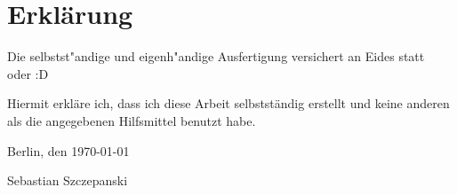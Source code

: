 \newpage
\section*{\vfill{} \thispagestyle{empty}
Erkl\"arung}
Die selbstst"andige und eigenh"andige Ausfertigung versichert an Eides
  statt\\

oder :D

Hiermit erkl\"are ich, dass ich diese Arbeit selbstst\"andig erstellt
und keine anderen als die angegebenen Hilfsmittel benutzt habe.
\bigskip{}

\noindent Berlin, den \today{}
\vspace{2.5cm}

\noindent Sebastian Szczepanski \cleardoublepage{}